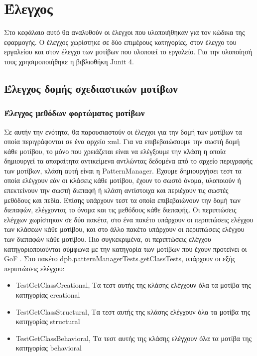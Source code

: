 \chapter{Έλεγχος}
\label{ch:testing}
Στο κεφάλαιο αυτό θα αναλυθούν οι έλεγχοι που υλοποιήθηκαν για τον κώδικα της εφαρμογής. 
Ο έλεγχος χωρίστηκε σε δύο επιμέρους κατηγορίες, στον έλεγχο του εργαλείου και στον έλεγχο των μοτίβων που υλοποιεί το εργαλείο.
Για την υλοποίησή τους χρησιμοποιήθηκε η βιβλιοθήκη Junit 4.
\section{Έλεγχος δομής σχεδιαστικών μοτίβων}
\label{sec:patternTesting}
\subsection{Έλεγχος μεθόδων φορτώματος μοτίβων}
\label{subsec:patternManagerTesting}
Σε αυτήν την ενότητα, θα παρουσιαστούν οι έλεγχοι για την δομή των μοτίβων τα οποία περιγράφονται σε ένα αρχείο xml.
Για να επιβεβαιώσουμε την σωστή δομή κάθε μοτίβου, το μόνο που χρειάζεται είναι να ελέγξουμε την κλάση η οποία δημιουργεί 
τα απαραίτητα αντικείμενα αντλώντας δεδομένα από το αρχείο περιγραφής των μοτίβων, κλάση αυτή είναι η PatternManager.
Έχουμε δημιουργήσει τεστ τα οποία ελέγχουν εάν οι κλάσεις κάθε μοτίβου, έχουν το σωστό όνομα, υλοποιούν ή επεκτείνουν την σωστή 
διεπαφή ή κλάση αντίστοιχα και περιέχουν τις σωστές μεθόδους και πεδία. Επίσης υπάρχουν τεστ τα οποία επιβεβαιώνουν την δομή των 
διεπαφών, ελέγχοντας το όνομα και τις μεθόδους κάθε διεπαφής. Οι περιπτώσεις ελέγχων χωρίστηκαν σε δύο πακέτα, 
στο ένα πακέτο υπάρχουν οι περιπτώσεις ελέγχου των κλάσεων κάθε μοτίβου, και στο άλλο πακέτο υπάρχουν οι περιπτώσεις ελέγχου 
των διεπαφών κάθε μοτίβου. Πιο συγκεκριμένα, οι περιπτώσεις ελέγχου κατηγοριοποιούνται σύμφωνα με την 
κατηγορία των μοτίβων που έχουν προτείνει οι GoF \cite{GoF}. Στο πακέτο dpb.patternManagerTests.getClassTests, υπάρχουν οι εξής περιπτώσεις ελέγχου:
\begin{itemize}
    \item TestGetClassCreational, Τα τεστ αυτής της κλάσης ελέγχουν όλα τα μοτίβα της κατηγορίας creational
    \item TestGetClassStructural, Τα τεστ αυτής της κλάσης ελέγχουν όλα τα μοτίβα της κατηγορίας structural
    \item TestGetClassBehavioral, Τα τεστ αυτής της κλάσης ελέγχουν όλα τα μοτίβα της κατηγορίας behavioral
\end{itemize}
